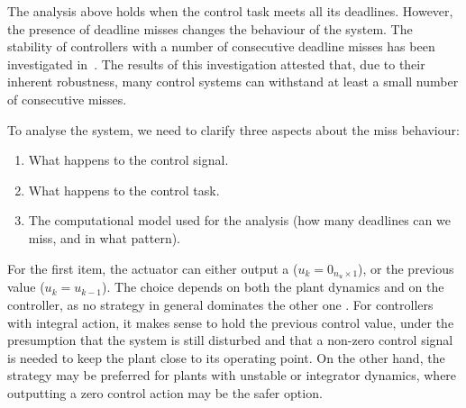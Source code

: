 The analysis above holds when the control task meets all its deadlines.
However, the presence of deadline misses changes the behaviour of the system.
The stability of controllers with a number of consecutive deadline misses has been investigated in~\cite{Maggio:2020}.
The results of this investigation attested that, due to their inherent robustness, many control systems can withstand at least a small number of consecutive misses.

To analyse the system, we need to clarify three aspects about the miss behaviour:

\begin{enumerate}[label=(\roman*)]
    \item What happens to the control signal.
    \item What happens to the control task.
    \item The computational model used for the analysis (how many deadlines can we miss, and in what pattern).
\end{enumerate}

For the first item, the actuator can either output a \emph{\tZ{}} ($u_k = 0_{n_u \times 1}$), or \emph{\tH{}} the previous value ($u_k = u_{k-1}$).
The choice depends on both the plant dynamics and on the controller, as no strategy in general dominates the other one \cite{schenato09}.
For controllers with integral action, it makes sense to hold the previous control value, under the presumption that the system is still disturbed and that a non-zero control signal is needed to keep the plant close to its operating point.
On the other hand, the \tZ{} strategy may be preferred for plants with unstable or integrator dynamics, where outputting a zero control action may be the safer option.

